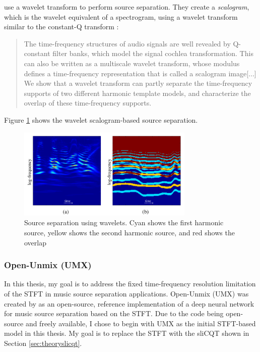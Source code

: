 \documentclass[report.tex]{subfiles}
\begin{document}
\textcite{wavelets} use a wavelet transform to perform source separation. They create a \textit{scalogram}, which is the wavelet equivalent of a spectrogram, using a wavelet transform similar to the constant-Q transform \parencite[2--3]{wavelets}:

\begin{quote}
       The time-frequency structures of audio signals are well revealed by Q-constant filter banks, which model the signal cochlea transformation. This can also be written as a multiscale wavelet transform, whose modulus defines a time-frequency representation that is called a scalogram image[...] We show that a wavelet transform can partly separate the time-frequency supports of two different harmonic template models, and characterize the overlap of these time-frequency supports.
\end{quote}

Figure \ref{fig:waveletsep} shows the wavelet scalogram-based source separation.

\begin{figure}[ht]
       \centering
       \includegraphics[width=0.75\textwidth]{./images-wavelets/wavelet_sep.png}
       \caption{Source separation using wavelets. Cyan shows the first harmonic source, yellow shows the second harmonic source, and red shows the overlap \parencite[5]{wavelets}}
       \label{fig:waveletsep}
\end{figure}

\subsubsection{Open-Unmix (UMX)}
\label{sec:umx}

In this thesis, my goal is to address the fixed time-frequency resolution limitation of the STFT in music source separation applications. Open-Unmix (UMX) was created by \textcite{umx} as an open-source, reference implementation of a deep neural network for music source separation based on the STFT. Due to the code being open-source and freely available, I chose to begin with UMX as the initial STFT-based model in this thesis. My goal is to replace the STFT with the sliCQT shown in Section \ref{sec:theoryslicqt}.
\end{document}
